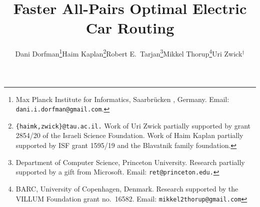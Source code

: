 \documentclass[11pt]{article}
\begin{document}
\title{\null\vspace*{-60pt}Faster All-Pairs Optimal Electric Car Routing}

\author{\begin{tabular}{ c c c c c}
       Dani Dorfman\thanks{Max Planck Institute for Informatics, Saarbr\"ucken
, Germany. Email: {\tt dani.i.dorfman@gmail.com}.}    &    Haim Kaplan\thanks{{\tt \{haimk,zwick\}@tau.ac.il.} Work of Uri Zwick partially supported by grant 2854/20 of the Israeli Science Foundation. Work of Haim Kaplan partially supported by ISF grant 1595/19 and the Blavatnik family foundation.}   &    Robert E.\ Tarjan\thanks{Department of Computer Science, Princeton University. Research partially supported by a gift from Microsoft. Email: {\tt ret@princeton.edu.}}\;  
       & Mikkel Thorup\thanks{BARC, University of Copenhagen, Denmark. Research supported by the VILLUM Foundation grant no.\ 16582. Email: {\tt mikkel2thorup@gmail.com}}\;    &   Uri Zwick${}^{\dag}$        
  \end{tabular}
}
\date{}
\maketitle
\end{document}
